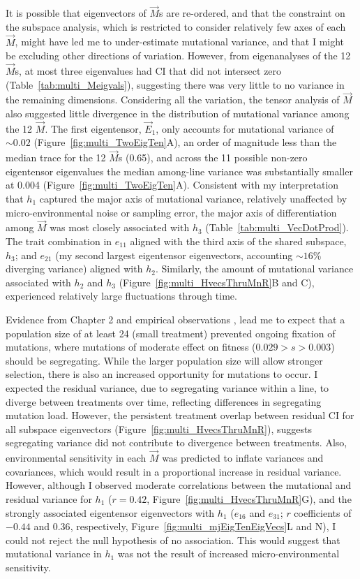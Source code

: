 It is possible that eigenvectors of $\vec{M}$s are re-ordered, and that the constraint on the subspace analysis, which is restricted to consider relatively few axes of each $\vec{M}$, might have led me to under-estimate mutational variance, and that I might be excluding other directions of variation. However, from eigenanalyses of the 12 $\vec{M}$s, at most three eigenvalues had CI that did not intersect zero (Table~\ref{tab:multi_Meigvals}), suggesting there was very little to no variance in the remaining dimensions. Considering all the variation, the tensor analysis of $\vec{M}$ also suggested little divergence in the distribution of mutational variance among the 12 $\vec{M}$. The first eigentensor, $\vec{E}_1$, only accounts for mutational variance of $\sim0.02$ (Figure~\ref{fig:multi_TwoEigTen}A), an order of magnitude less than the median trace for the 12 $\vec{M}$s (0.65), and across the 11 possible non-zero eigentensor eigenvalues the median among-line variance was substantially smaller at 0.004 (Figure~\ref{fig:multi_TwoEigTen}A). Consistent with my interpretation that $h_1$ captured the major axis of mutational variance, relatively unaffected by micro-environmental noise or sampling error, the major axis of differentiation among $\vec{M}$ was most closely associated with $h_3$ (Table~\ref{tab:multi_VecDotProd}). The trait combination in $e_{11}$ aligned with the third axis of the shared subspace, $h_3$; and $e_{21}$ (my second largest eigentensor eigenvectors, accounting $\sim16$\% diverging variance) aligned with $h_2$. Similarly, the amount of mutational variance associated with $h_2$ and $h_3$ (Figure~\ref{fig:multi_HvecsThruMnR}B and C), experienced relatively large fluctuations through time.\par

Evidence from Chapter 2 and empirical observations \citep{Este04, Katj15}, lead me to expect that a population size of at least 24 (small treatment) prevented ongoing fixation of mutations, where mutations of moderate effect on fitness ($0.029 > s > 0.003$) should be segregating. While the larger population size will allow stronger selection, there is also an increased opportunity for mutations to occur. I expected the residual variance, due to segregating variance within a line, to diverge between treatments over time, reflecting differences in segregating mutation load. However, the persistent treatment overlap between residual CI for all subspace eigenvectors (Figure~\ref{fig:multi_HvecsThruMnR}), suggests segregating variance did not contribute to divergence between treatments. Also, environmental sensitivity in each $\vec{M}$ was predicted to inflate variances and covariances, which would result in a proportional increase in residual variance. However, although I observed moderate correlations between the mutational and residual variance for $h_1$ ($r = 0.42$, Figure~\ref{fig:multi_HvecsThruMnR}G), and the strongly associated eigentensor eigenvectors with $h_1$ ($e_{16}$ and $e_{31}$; $r$ coefficients of $-0.44$ and $0.36$, respectively, Figure~\ref{fig:multi_mjEigTenEigVecs}L and N), I could not reject the null hypothesis of no association. This would suggest that mutational variance in $h_1$ was not the result of increased micro-environmental sensitivity.\par

